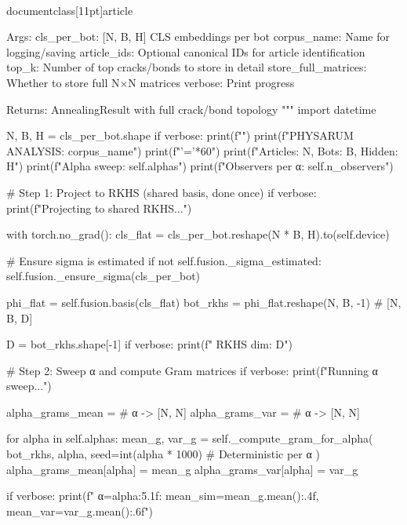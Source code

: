 \\documentclass[11pt]{article}
\begin{document}
\begin{CodeBlock}
{{{{{{{{        Args:
            cls_per_bot: [N, B, H] CLS embeddings per bot
            corpus_name: Name for logging/saving
            article_ids: Optional canonical IDs for article identification
            top_k: Number of top cracks/bonds to store in detail
            store_full_matrices: Whether to store full N×N matrices
            verbose: Print progress
            
        Returns:
            AnnealingResult with full crack/bond topology
        """
        import datetime
        
        N, B, H = cls_per_bot.shape
        if verbose:
            print(f"")
            print(f"PHYSARUM ANALYSIS: {corpus_name}")
            print(f"{'='*60}")
            print(f"Articles: {N}, Bots: {B}, Hidden: {H}")
            print(f"Alpha sweep: {self.alphas}")
            print(f"Observers per α: {self.n_observers}")
        
        # Step 1: Project to RKHS (shared basis, done once)
        if verbose:
            print(f"\n[1/4] Projecting to shared RKHS...")
        
        with torch.no_grad():
            cls_flat = cls_per_bot.reshape(N * B, H).to(self.device)
            
            # Ensure sigma is estimated
            if not self.fusion._sigma_estimated:
                self.fusion._ensure_sigma(cls_per_bot)
            
            phi_flat = self.fusion.basis(cls_flat)
            bot_rkhs = phi_flat.reshape(N, B, -1)  # [N, B, D]
        
        D = bot_rkhs.shape[-1]
        if verbose:
            print(f"  RKHS dim: {D}")
        
        # Step 2: Sweep α and compute Gram matrices
        if verbose:
            print(f"\n[2/4] Running α sweep...")
        
        alpha_grams_mean = {}  # α -> [N, N]
        alpha_grams_var = {}   # α -> [N, N]
        
        for alpha in self.alphas:
            mean_g, var_g = self._compute_gram_for_alpha(
                bot_rkhs, alpha, seed=int(alpha * 1000)  # Deterministic per α
            )
            alpha_grams_mean[alpha] = mean_g
            alpha_grams_var[alpha] = var_g
            
            if verbose:
                print(f"  α={alpha:5.1f}: mean_sim={mean_g.mean():.4f}, mean_var={var_g.mean():.6f}")
        
}}}}}}}}
\end{CodeBlock}
\end{document}
